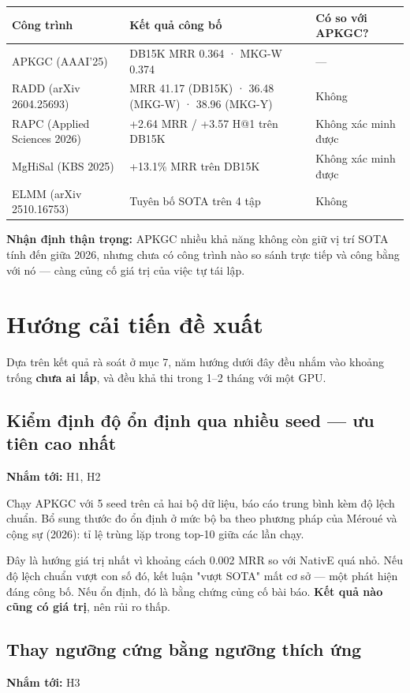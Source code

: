 \documentclass[11pt,a4paper]{article}
\begin{document}
\begin{center}\small
\begin{tabular}{@{}lll@{}}
\toprule
\textbf{Công trình} & \textbf{Kết quả công bố} & \textbf{Có so với APKGC?}\\
\midrule
APKGC (AAAI'25) & DB15K MRR 0.364 · MKG-W 0.374 & ---\\
RADD (arXiv 2604.25693) & MRR 41.17 (DB15K) · 36.48 (MKG-W) · 38.96 (MKG-Y) & Không\\
RAPC (Applied Sciences 2026) & +2.64 MRR / +3.57 H@1 trên DB15K & Không xác minh được\\
MgHiSal (KBS 2025) & +13.1\% MRR trên DB15K & Không xác minh được\\
ELMM (arXiv 2510.16753) & Tuyên bố SOTA trên 4 tập & Không\\
\bottomrule
\end{tabular}
\end{center}
\textbf{Nhận định thận trọng:} APKGC nhiều khả năng không còn giữ vị trí SOTA tính đến giữa 2026, nhưng chưa có công trình nào so sánh trực tiếp và công bằng với nó --- càng củng cố giá trị của việc tự tái lập.

\section{Hướng cải tiến đề xuất}
Dựa trên kết quả rà soát ở mục 7, năm hướng dưới đây đều nhắm vào khoảng trống \textbf{chưa ai lấp}, và đều khả thi trong 1--2 tháng với một GPU.

\subsection{Kiểm định độ ổn định qua nhiều seed --- ưu tiên cao nhất}
\textbf{Nhắm tới:} H1, H2

Chạy APKGC với 5 seed trên cả hai bộ dữ liệu, báo cáo trung bình kèm độ lệch chuẩn. Bổ sung thước đo ổn định ở mức bộ ba theo phương pháp của Méroué và cộng sự (2026): tỉ lệ trùng lặp trong top-10 giữa các lần chạy.

Đây là hướng giá trị nhất vì khoảng cách 0.002 MRR so với NativE quá nhỏ. Nếu độ lệch chuẩn vượt con số đó, kết luận "vượt SOTA" mất cơ sở --- một phát hiện đáng công bố. Nếu ổn định, đó là bằng chứng củng cố bài báo. \textbf{Kết quả nào cũng có giá trị}, nên rủi ro thấp.

\subsection{Thay ngưỡng cứng bằng ngưỡng thích ứng}
\textbf{Nhắm tới:} H3
\end{document}
